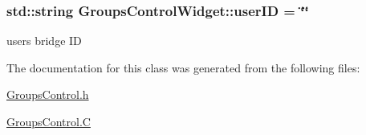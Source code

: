 \subsubsection[{\texorpdfstring{user\+ID}{userID}}]{\setlength{\rightskip}{0pt plus 5cm}std\+::string Groups\+Control\+Widget\+::user\+ID = \char`\"{}\char`\"{}\hspace{0.3cm}{\ttfamily [private]}}\hypertarget{classGroupsControlWidget_a5254fd01a7e3c5d56515d1161f392b09}{}\label{classGroupsControlWidget_a5254fd01a7e3c5d56515d1161f392b09}
user\textquotesingle{}s bridge ID 

The documentation for this class was generated from the following files\+:\begin{DoxyCompactItemize}
\item 
\hyperlink{GroupsControl_8h}{Groups\+Control.\+h}\item 
\hyperlink{GroupsControl_8C}{Groups\+Control.\+C}\end{DoxyCompactItemize}
